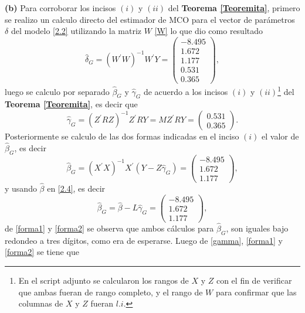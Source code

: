 \documentclass[10.5pt,notitlepage]{article}
\theoremstyle{plain}
\begin{document}
\textbf{(b)} Para corroborar los incisos \((i)\) y \((ii)\) del \textbf{Teorema \ref{Teoremita}}, primero se realizo un calculo directo del estimador de MCO para el vector de parámetros \(\delta\) del modelo \eqref{2.2} utilizando la matriz \(W\) \eqref{W} lo que dio como resultado
\begin{equation}\label{deltadir}
    \hat{\delta}_{G} =(W^{'}W)^{-1}W^{'}Y = \begin{pmatrix} -8.495\\1.672\\ 1.177\\ 0.531\\ 0.365 \end{pmatrix},
\end{equation}
luego se calculo por separado \(\hat{\beta}_G\) y \(\hat{\gamma}_{G}\) de acuerdo a los incisos \((i)\) y \((ii)\)\footnote{En el script adjunto se calcularon los rangos de \(X\) y \(Z\) con el fin de verificar que ambas fueran de rango completo, y el rango de \(W\) para confirmar que las columnas de \(X\) y \(Z\) fueran \(l.i\).} del \textbf{Teorema \ref{Teoremita}}, es decir que 
\begin{equation}\label{gamma}
    \hat{\gamma}_{G} = (Z^{'}R Z)^{-1}Z^{'}RY= MZ^{'}RY = \begin{pmatrix}0.531\\ 0.365 \end{pmatrix}.
\end{equation}
Posteriormente se calculo de las dos formas indicadas en el inciso \((i)\) el valor de \(\hat{\beta}_{G}\), es decir 
\begin{equation}\label{forma1}
    \hat{\beta}_{G} = (X^{'}X)^{-1}X^{'}(Y - Z \hat{\gamma}_{G}) = \begin{pmatrix}-8.495\\ 1.672\\ 1.177 \end{pmatrix},
\end{equation}
y usando \(\hat{\beta}\) en \eqref{2.4}, es decir
\begin{equation}\label{forma2}
   \hat{\beta}_{G} =  \hat{\beta} - L \hat{\gamma}_{G} = \begin{pmatrix}-8.495\\ 1.672\\ 1.177 \end{pmatrix},
\end{equation}
de \eqref{forma1} y \eqref{forma2} se observa que ambos cálculos para \(\hat{\beta}_{G}\), son iguales bajo redondeo a tres dígitos, como era de esperarse. Luego de \eqref{gamma}, \eqref{forma1} y \eqref{forma2} se tiene que 
\end{document}
